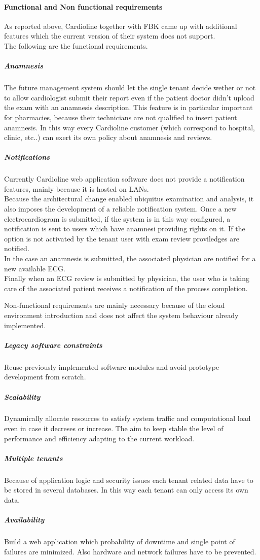 \paragraph{Functional and Non functional requirements} As reported above, Cardioline together with FBK came up with additional features which the current version of their system does not support.\\The following are the functional requirements.
\subparagraph{Anamnesis}The future management system should let the single tenant decide wether or not to allow cardiologist submit their report even if the patient doctor didn't upload the exam with an anamnesis description. This feature is in particular important for pharmacies, because their technicians are not qualified to insert patient anamnesis. In this way every Cardioline customer (which correspond to hospital, clinic, etc..) can exert its own policy about anamnesis and reviews.
\subparagraph{Notifications}Currently Cardioline web application software does not provide a notification features, mainly because it is hosted on LANs.\\Because the architectural change enabled ubiquitus examination and analysis, it also imposes the development of a reliable notification system. Once a new electrocardiogram is submitted, if the system is in this way configured, a notification is sent to users which have anamnesi providing rights on it. If the option is not activated by the tenant user with exam review proviledges are notified.\\In the case an anamnesis is submitted, the associated physician are notified for a new available ECG.\\Finally when an ECG review is submitted by physician, the user who is taking care of the associated patient receives a notification of the process completion.

Non-functional requirements are mainly necessary because of the cloud environment introduction and does not affect the system behaviour already implemented.

\subparagraph{Legacy software constraints}
Reuse previously implemented software modules and avoid prototype development from scratch.
\subparagraph{Scalability}
Dynamically allocate resources to satisfy system traffic and computational load even in case it decreses or increase. The aim to keep stable the level of performance and efficiency adapting to the current workload.\\
\subparagraph{Multiple tenants}
Because of application logic and security issues each tenant related data have to be stored in several databases. In this way each tenant can only access its own data.
\subparagraph{Availability}
Build a web application which probability of downtime and single point of failures are minimized. Also hardware and network failures have to be prevented.

